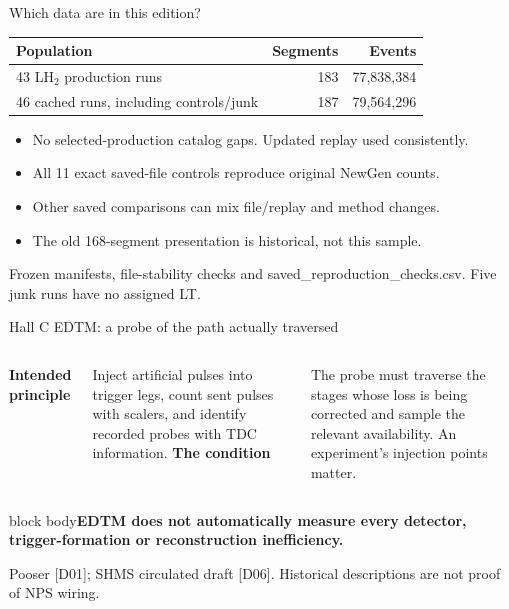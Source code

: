 \documentclass[aspectratio=169,11pt]{beamer}
\newcommand{\source}[1]{\par\vfill{\scriptsize\color{muted}#1\par}}
\newcommand{\takeaway}[1]{\begin{beamercolorbox}[sep=2.5mm,wd=\linewidth]{block body}\textbf{#1}\end{beamercolorbox}}
\begin{document}
\begin{frame}{Which data are in this edition?}
\large\begin{tabular}{@{}lrr@{}}\toprule
Population & Segments & Events\\\midrule
43 LH$_2$ production runs & 183 & 77,838,384\\
46 cached runs, including controls/junk & 187 & 79,564,296\\\bottomrule
\end{tabular}
\vspace{5mm}\normalsize
\begin{itemize}\setlength\itemsep{2mm}
\item No selected-production catalog gaps. Updated replay used consistently.
\item All 11 exact saved-file controls reproduce original NewGen counts.
\item Other saved comparisons can mix file/replay and method changes.
\item The old 168-segment presentation is historical, not this sample.
\end{itemize}
\source{Frozen manifests, file-stability checks and saved\_reproduction\_checks.csv. Five junk runs have no assigned LT.}
\end{frame}

\begin{frame}{Hall C EDTM: a probe of the path actually traversed}
\begin{columns}[T]
\textbf{Intended principle}\par\vspace{2mm}
Inject artificial pulses into trigger legs, count sent pulses with scalers,
and identify recorded probes with TDC information.
\textbf{The condition}\par\vspace{2mm}
The probe must traverse the stages whose loss is being corrected and sample
the relevant availability. An experiment's injection points matter.
\end{columns}
\vspace{6mm}\takeaway{EDTM does not automatically measure every detector, trigger-formation or reconstruction inefficiency.}
\source{Pooser [D01]; SHMS circulated draft [D06]. Historical descriptions are not proof of NPS wiring.}
\end{frame}
\end{document}
